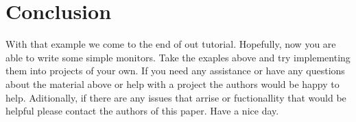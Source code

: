 
\newpage 
\section{Conclusion}
\label{conclusion}
	With that example we come to the end of out tutorial. Hopefully, now
you are able to write some simple monitors. Take the exaples above and try
implementing them into projects of your own. If you need any assistance or have
any questions about the material above or help with a project the authors would
be happy to help. Aditionally, if there are any issues that arrise or
fuctionallity that would be helpful please contact the authors of this paper.
Have a nice day.
